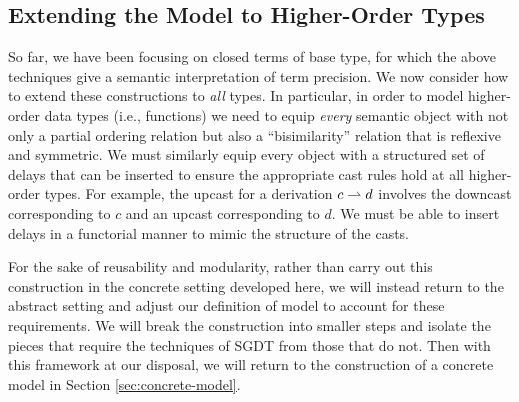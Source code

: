

\subsection{Extending the Model to Higher-Order Types}


So far, we have been focusing on closed terms of base type, for which the above
techniques give a semantic interpretation of term precision. We now consider how
to extend these constructions to \emph{all} types. In particular, in order to
model higher-order data types (i.e., functions) we need to equip \emph{every}
semantic object with not only a partial ordering relation but also a
``bisimilarity'' relation that is reflexive and symmetric. We must similarly
equip every object with a structured set of delays that can be inserted to
ensure the appropriate cast rules hold at all higher-order types. For example,
the upcast for a derivation $c \rightharpoonup d$ involves the downcast corresponding to $c$
and an upcast corresponding to $d$. We must be able to insert delays in a
functorial manner to mimic the structure of the casts.

For the sake of reusability and modularity, rather than carry out this
construction in the concrete setting developed here, we will instead return to
the abstract setting and adjust our definition of model to account for these
requirements. We will break the construction into smaller steps and isolate the
pieces that require the techniques of SGDT from those that do not. Then with
this framework at our disposal, we will return to the construction of a concrete
model in Section \ref{sec:concrete-model}.

